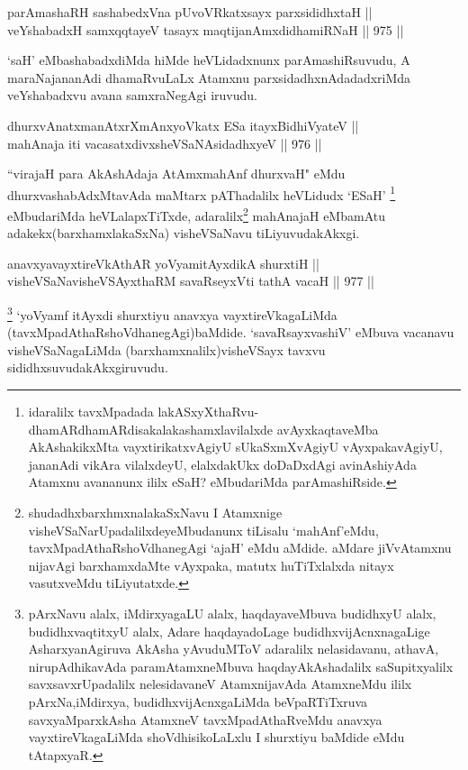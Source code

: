 
\begin{shl}
parAmashaRH sashabedxVna pUvoVRkatxsayx parxsididhxtaH || \\
veYshabadxH samxqqtayeV tasayx maqtijanAmxdidhamiRNaH \hfill || 975 ||  
\end{shl}

\begin{artha}
`saH' eMbashabadxdiMda hiMde heVLidadxnunx parAmashiRsuvudu, A maraNajananAdi dhamaRvuLaLx Atamxnu parxsidadhxnAdadadxriMda veYshabadxvu avana samxraNegAgi iruvudu.
\end{artha}


\begin{shl}
dhurxvAnatxmanAtxrXmAnxyoVkatx ESa itayxBidhiVyateV || \\
mahAnaja iti vacasatxdivxsheVSaNAsidadhxyeV \hfill || 976 ||  
\end{shl}

\begin{artha}
``virajaH para AkAshAdaja AtAmxmahAnf dhurxvaH" eMdu dhurxvashabAdxMtavAda maMtarx pAThadalilx heVLidudx `ESaH' \footnote{idaralilx tavxMpadada lakASxyXthaRvu-dhamARdhamARdisakalakashamxlavilalxde avAyxkaqtaveMba AkAshakikxMta vayxtirikatxvAgiyU sUkaSxmXvAgiyU vAyxpakavAgiyU, jananAdi vikAra vilalxdeyU, elalxdakUkx doDaDxdAgi avinAshiyAda Atamxnu avananunx ililx eSaH? eMbudariMda parAmashiRside.} eMbudariMda heVLalapxTiTxde, adaralilx\footnote{shudadhxbarxhmxnalakaSxNavu I Atamxnige visheVSaNarUpadalilxdeyeMbudanunx tiLisalu `mahAnf'eMdu, tavxMpadAthaRshoVdhanegAgi `ajaH' eMdu aMdide. aMdare jiVvAtamxnu nijavAgi barxhamxdaMte vAyxpaka, matutx huTiTxlalxda nitayx vasutxveMdu tiLiyutatxde.} mahAnajaH eMbamAtu adakekx(barxhamxlakaSxNa) visheVSaNavu tiLiyuvudakAkxgi.
\end{artha}


\begin{shl}
anavxyavayxtireVkAthAR yoV\s yamitAyxdikA shurxtiH || \\
visheVSaNavisheVSAyxthaRM savaRseyxVti tathA vacaH \hfill || 977 ||  
\end{shl}

\begin{artha}
\footnote{pArxNavu alalx, iMdirxyagaLU alalx, haqdayaveMbuva budidhxyU alalx, budidhxvaqtitxyU alalx, Adare haqdayadoLage budidhxvijAcnxnagaLige AsharxyanAgiruva AkAsha yAvuduMToV adaralilx nelasidavanu, athavA, nirupAdhikavAda paramAtamxneMbuva haqdayAkAshadalilx saSupitxyalilx savxsavxrUpadalilx nelesidavaneV AtamxnijavAda AtamxneMdu ililx pArxNa,iMdirxya, budidhxvijAcnxgaLiMda beVpaRTiTxruva savxyaMparxkAsha AtamxneV tavxMpadAthaRveMdu anavxya vayxtireVkagaLiMda shoVdhisikoLaLxlu I shurxtiyu baMdide eMdu tAtapxyaR.} `yoV\s yamf  itAyxdi shurxtiyu anavxya vayxtireVkagaLiMda (tavxMpadAthaRshoVdhanegAgi)baMdide. `savaRsayxvashiV' eMbuva vacanavu visheVSaNagaLiMda (barxhamxnalilx)visheVSayx tavxvu sididhxsuvudakAkxgiruvudu.
\end{artha}

